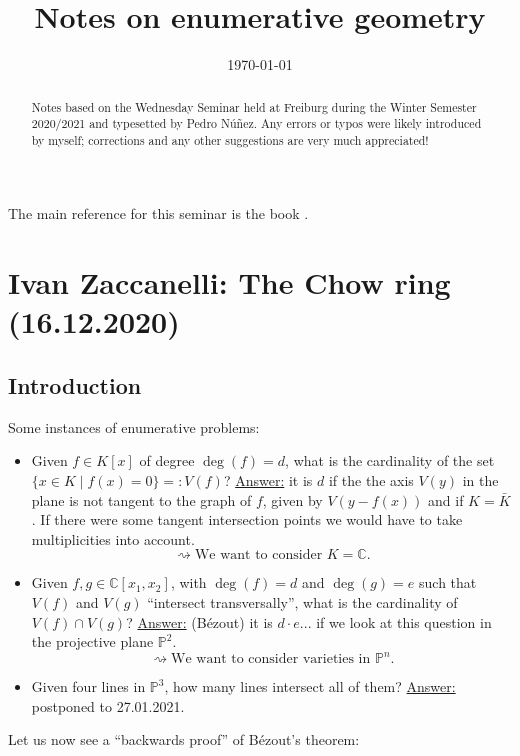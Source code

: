 \documentclass[12pt,a4paper]{amsart}
\title[Notes on enumerative geometry]{Notes on enumerative geometry}
\author[Pedro N\'{u}\~{n}ez]{}
\date{\today}
\theoremstyle{plain}
\theoremstyle{definition}
\theoremstyle{remark}
\begin{document}
\maketitle

\begin{abstract}
	Notes based on the Wednesday Seminar held at Freiburg during the Winter Semester 2020/2021 and typesetted by Pedro N\'{u}\~{n}ez.
	Any errors or typos were likely introduced by myself; corrections and any other suggestions are very much appreciated!
\end{abstract}

\tableofcontents

The main reference for this seminar is the book \cite{eh16}.

\section{Ivan Zaccanelli: The Chow ring (16.12.2020)}

\subsection{Introduction}

Some instances of enumerative problems:

\begin{itemize}
    \item Given $f\in K[x]$ of degree $\deg(f)=d$, what is the cardinality of the set $\{ x\in K\mid f(x)=0\}=:V(f)$?
	\underline{Answer:} it is $d$ if the the axis $V(y)$ in the plane is not tangent to the graph of $f$, given by $V(y-f(x))$ and if $K=\bar{K}$.
	If there were some tangent intersection points we would have to take multiplicities into account.
	\[ \rightsquigarrow \text{We want to consider }K=\mathbb{C}. \]
    \item Given $f,g\in \mathbb{C}[x_{1},x_{2}]$, with $\deg(f)=d$ and $\deg(g)=e$ such that $V(f)$ and $V(g)$ ``intersect transversally'', what is the cardinality of $V(f)\cap V(g)$?
	\underline{Answer:} (Bézout) it is $d\cdot e$... if we look at this question in the projective plane $\mathbb{P}^{2}$.
	\[ \rightsquigarrow \text{We want to consider varieties in }\mathbb{P}^{n}. \]
    \item Given four lines in $\mathbb{P}^{3}$, how many lines intersect all of them?
	\underline{Answer:} postponed to 27.01.2021.
\end{itemize}

Let us now see a ``backwards proof'' of Bézout's theorem:
\end{document}
